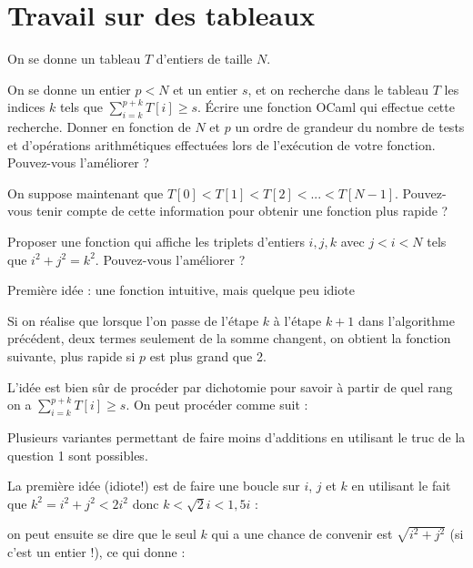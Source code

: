 \renewcommand{\SourceFile}{1-parcours-de-tableaux/src/1-3.ml}

\vspace{16pt}
\section{Travail sur des tableaux}

On se donne un tableau $T$ d'entiers de taille $N$.

\Q
On se donne un entier $p<N$ et un entier $s$, et on recherche dans le tableau $T$ les indices $k$ tels que $\sum^{p+k}_{i=k}T[i]\geq s$. Écrire une fonction OCaml qui effectue cette recherche. Donner en fonction de $N$ et $p$ un ordre de grandeur du nombre de tests et d'opérations arithmétiques effectuées lors de l'exécution de votre fonction. Pouvez-vous l'améliorer ?

\Q
On suppose maintenant que $T[0] < T[1] < T[2] < ... < T[N-1]$. Pouvez-vous tenir compte de cette information pour obtenir une fonction plus rapide ?

\Q
Proposer une fonction qui affiche les triplets d'entiers $i,j,k$ avec $j<i<N$ tels que $i^2+j^2=k^2$. Pouvez-vous l'améliorer ?

\Corrige

\Q
Première idée : une fonction intuitive, mais quelque peu idiote



Si on réalise que lorsque l'on passe de l'étape $k$ à l'étape $k+1$ dans l'algorithme précédent, deux termes seulement de la somme changent, on obtient la fonction suivante, plus rapide si $p$ est plus grand que 2.



\Q
L'idée est bien sûr de procéder par dichotomie pour savoir à partir de quel rang on a $\sum^{p+k}_{i=k}T[i]\geq s$. On peut procéder comme suit :



Plusieurs variantes permettant de faire moins d'additions en utilisant le \og truc \fg{} de la question 1 sont possibles.

\newpage

\Q
La première idée (idiote!) est de faire une boucle sur $i$, $j$ et $k$ en utilisant le fait que $k^2=i^2+j^2<2i^2$ donc $k<\sqrt{2}i<1,5i$ :



on peut ensuite se dire que le seul $k$ qui a une chance de convenir est $\sqrt{i^2+j^2}$ (si c'est un entier !), ce qui donne :



\Fin